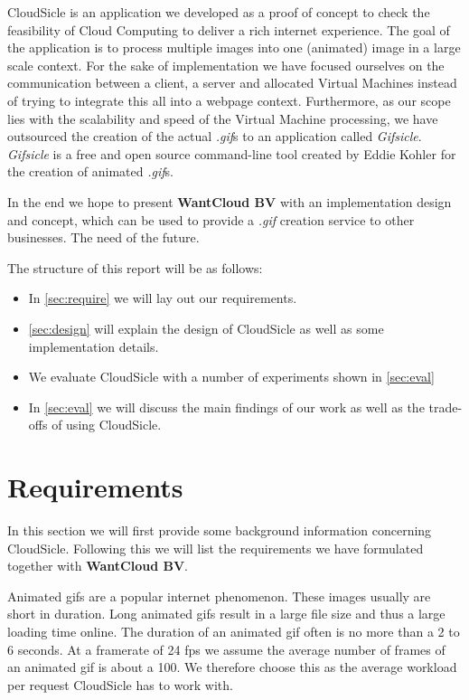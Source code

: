 \documentclass[twocolumn,twoside]{IEEEtran}
\begin{document}
CloudSicle is an application we developed as a proof of concept to 
check the feasibility of Cloud Computing to deliver a rich internet experience.
The goal of the application is to process multiple images into one (animated) image in a large scale context. For the sake of implementation
we have focused ourselves on the communication between a client,
a server and allocated Virtual Machines instead of trying to integrate this all into a 
webpage context. Furthermore, as our scope lies with the scalability
and speed of the Virtual Machine processing, we have outsourced the
creation of the actual \textit{.gif}s to an application called \textit{Gifsicle}\cite{gifsicle}.
\textit{Gifsicle} is a free and open source command-line tool created
by Eddie Kohler for the creation of animated \textit{.gif}s.

In the end we hope to present \textbf{WantCloud BV} with an implementation
design and concept, which can be used to provide a \textit{.gif}
creation service to other businesses. The need of the future.

The structure of this report will be as follows:
\begin{itemize}
\item In \autoref{sec:require} we will lay out our requirements.
\item \autoref{sec:design} will explain the design of CloudSicle as well as some implementation details.
\item We evaluate CloudSicle with a number of experiments shown in \autoref{sec:eval}
\item In \autoref{sec:eval} we will discuss the main findings of our work as well as the trade-offs of using CloudSicle.
\end{itemize}

\section{Requirements}
\label{sec:require}
In this section we will first provide some background information concerning CloudSicle. Following this we will list the requirements we have formulated  together with \textbf{WantCloud BV}.

Animated gifs are a popular internet phenomenon. These images usually are short in duration. Long animated gifs result in a large file size and thus a large loading time online. The duration of an animated gif often is no more than a 2 to 6 seconds. At a framerate of 24 fps we assume the average number of frames of an animated gif is about a 100. We therefore choose this as the average workload per request CloudSicle has to work with.
\end{document}
